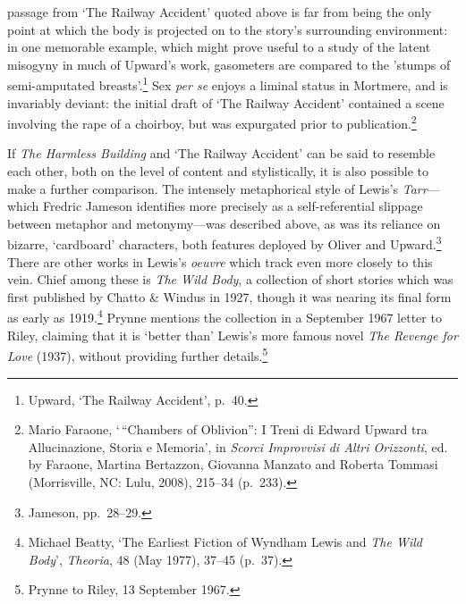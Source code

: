 \documentclass[]{article}
\begin{document}
passage from `The Railway Accident' quoted above is far from being the
only point at which the body is projected on to the story's surrounding
environment: in one memorable example, which might prove useful to a
study of the latent misogyny in much of Upward's work, gasometers are
compared to the 'stumps of semi-amputated breasts'.\footnote{Upward,
  `The Railway Accident', p.~40.} Sex \emph{per se} enjoys a liminal
status in Mortmere, and is invariably deviant: the initial draft of `The
Railway Accident' contained a scene involving the rape of a choirboy,
but was expurgated prior to publication.\footnote{Mario Faraone,
  `\,``Chambers of Oblivion'': I Treni di Edward Upward tra
  Allucinazione, Storia e Memoria', in \emph{Scorci Improvvisi di Altri
  Orizzonti}, ed. by Faraone, Martina Bertazzon, Giovanna Manzato and
  Roberta Tommasi (Morrisville, NC: Lulu, 2008), 215--34 (p.~233).}

If \emph{The Harmless Building} and `The Railway Accident' can be said
to resemble each other, both on the level of content and stylistically,
it is also possible to make a further comparison. The intensely
metaphorical style of Lewis's \emph{Tarr}---which Fredric Jameson
identifies more precisely as a self-referential slippage between
metaphor and metonymy---was described above, as was its reliance on
bizarre, `cardboard' characters, both features deployed by Oliver and
Upward.\footnote{Jameson, pp.~28--29.} There are other works in Lewis's
\emph{oeuvre} which track even more closely to this vein. Chief among
these is \emph{The Wild Body}, a collection of short stories which was
first published by Chatto \& Windus in 1927, though it was nearing its
final form as early as 1919.\footnote{Michael Beatty, `The Earliest
  Fiction of Wyndham Lewis and \emph{The Wild Body}', \emph{Theoria}, 48
  (May 1977), 37--45 (p.~37).} Prynne mentions the collection in a
September 1967 letter to Riley, claiming that it is `better than'
Lewis's more famous novel \emph{The Revenge for Love} (1937), without
providing further details.\footnote{Prynne to Riley, 13 September 1967.}
\end{document}
